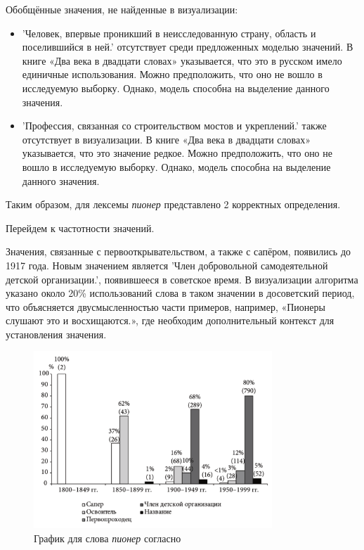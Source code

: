Обобщённые значения, не найденные в визуализации:
\begin{itemize}
    \item ’Человек, впервые проникший в неисследованную страну, область и поселившийся в ней.’
отсутствует среди предложенных моделью значений.
В книге «Два века в двадцати словах» указывается, что это в русском имело единичные использования.
Можно предположить, что оно не вошло в исследуемую выборку.
Однако, модель способна на выделение данного значения.  %

    \item ’Профессия, связанная со строительством мостов и укреплений.’ также отсутствует в визуализации.
В книге «Два века в двадцати словах» указывается, что это значение редкое.
Можно предположить, что оно не вошло в исследуемую выборку.
Однако, модель способна на выделение данного значения.  %
\end{itemize}

Таким образом, для лексемы \textit{пионер} представлено 2 корректных определения.

Перейдем к частотности значений.

Значения, связанные с первооткрывательством, а также с сапёром, появились до 1917 года.
Новым значением является ’Член добровольной самодеятельной детской организации.’,
появившееся в советское время.
В визуализации алгоритма указано около 20\% использований слова в таком значении
в досоветский период, что объясняется двусмысленностью части примеров,
например, «Пионеры слушают это и восхищаются.», где необходим дополнительный контекст
для установления значения.

\begin{figure}[H]
    \centering %
    \includegraphics[width=0.8\textwidth]{img/book/pioner/all}
    \caption{График для слова \textit{пионер} согласно~\cite{TwoCenturies}}
\end{figure}

